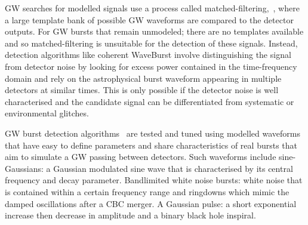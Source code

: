 \documentclass[12pt]{iopart}
\newcommand{\chris}[1]{\textbf{\textcolor{green}{CHRIS: #1}}}
\begin{document}
%
\ac{GW} searches for modelled signals use a process called
matched-filtering,~\cite{Owen1998,Usman_2016,sachdev2019gstlal}, where a large template bank of possible
\ac{GW} waveforms are compared to the detector outputs. For \ac{GW} bursts that remain unmodeled; there are no
templates available and so matched-filtering is unsuitable for the detection of
these signals.  Instead, detection algorithms like coherent WaveBurst \cite{drago2020coherent} involve distinguishing the signal from
detector noise by looking for excess power contained in the time-frequency
domain and rely on the
astrophysical burst waveform appearing in multiple detectors at similar times.
This is only possible if the detector noise is well characterised and the
candidate signal can be differentiated from systematic or environmental
glitches. 

%
\ac{GW} burst detection algorithms~\cite{Klimenko_2008, Aso_2008} are tested
and tuned using modelled waveforms that have easy to define parameters and share characteristics of real bursts that aim to simulate a \ac{GW} passing between
detectors. Such waveforms include sine-Gaussians: a
Gaussian modulated sine wave that is characterised by its central frequency and
decay parameter. Bandlimited white noise bursts: white noise that is contained
within a certain frequency range and ringdowns which mimic the damped
oscillations after a \ac{CBC} merger. A Gaussian pulse: a short exponential increase then decrease in amplitude and a binary black hole inspiral.
%

\end{document}
